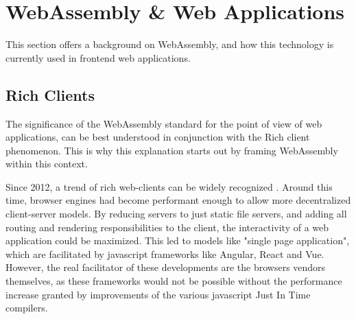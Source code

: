 


\section{WebAssembly \& Web Applications}
\label{sec:background-web}

This section offers a background on WebAssembly, and how this technology is currently used in frontend web applications.

\subsection{Rich Clients}
\label{sec:background-web-rich}

The significance of the WebAssembly standard for the point of view of web applications, can be best understood in conjunction with the Rich client phenomenon. 
This is why this explanation starts out by framing WebAssembly within this context.




Since 2012, a trend of rich web-clients can be widely recognized \cite{hamilton_client-side_2014, panidi_hybrid_2015, kulawiak_analysis_2019}.
Around this time, browser engines had become performant enough to allow more decentralized client-server models.
By reducing servers to just static file servers, and adding all routing and rendering responsibilities to the client, the interactivity of a web application could be maximized. 
This led to models like "single page application", which are facilitated by javascript frameworks like Angular, React and Vue.
However, the real facilitator of these developments are the browsers vendors themselves, as these frameworks would not be possible without the performance increase granted by improvements of the various javascript Just In Time compilers. 

